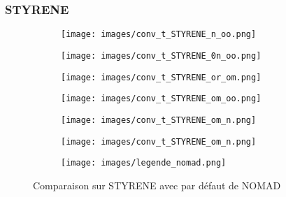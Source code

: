 		\subsubsection{STYRENE}
		\begin{figure}[!htb] %
			\centering
			\begin{subfigure}{0.43\textwidth}
				\texttt{[image: images/conv\_t\_STYRENE\_n\_oo.png]}
			\end{subfigure}%
			\begin{subfigure}{0.43\textwidth}
				\texttt{[image: images/conv\_t\_STYRENE\_0n\_oo.png]}
			\end{subfigure}
			\smallskip
			\begin{subfigure}{0.43\textwidth}
				\texttt{[image: images/conv\_t\_STYRENE\_or\_om.png]}
			\end{subfigure}%
			\begin{subfigure}{0.43\textwidth}
				\texttt{[image: images/conv\_t\_STYRENE\_om\_oo.png]}
			\end{subfigure}
			\smallskip
			\begin{subfigure}{0.43\textwidth}
				\texttt{[image: images/conv\_t\_STYRENE\_om\_n.png]}
			\end{subfigure}%
			\begin{subfigure}{0.43\textwidth}
				\texttt{[image: images/conv\_t\_STYRENE\_om\_n.png]}
			\end{subfigure}
			\smallskip
			\begin{subfigure}{0.95\textwidth}
				\texttt{[image: images/legende\_nomad.png]}
			\end{subfigure}
			\caption{Comparaison sur STYRENE avec \MADS par défaut de NOMAD} \label{fig:3}
		\end{figure}
	\clearpage
